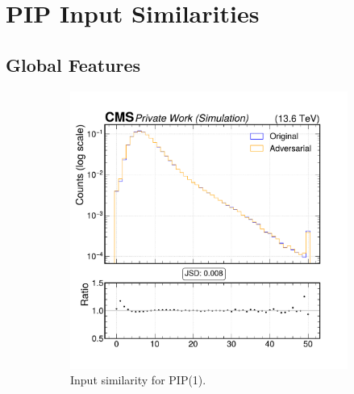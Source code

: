 \section{PIP Input Similarities}
\label{appendix:intprob}

\subsection*{Global Features}

\begin{figure}[h]
  \centering
  \begin{subfigure}[t]{0.32\textwidth}
    \includegraphics[width=\linewidth]{media/output/features/compare/intprob_1/cmp_global_features_n_Cpfcand.pdf}
    \caption{Input similarity for PIP(1).}
  \end{subfigure}\hfill
  \begin{subfigure}[t]{0.32\textwidth}

\end{subfigure}
\end{figure}

